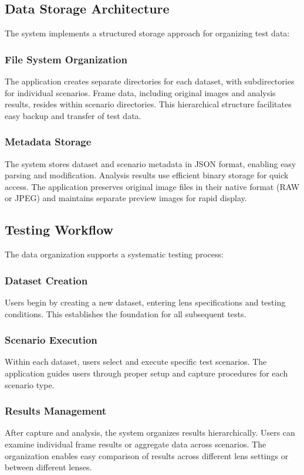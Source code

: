 \subsection{Data Storage Architecture}
The system implements a structured storage approach for organizing test data:

\subsubsection{File System Organization}
The application creates separate directories for each dataset, with subdirectories for individual scenarios. Frame data, including original images and analysis results, resides within scenario directories. This hierarchical structure facilitates easy backup and transfer of test data.

\subsubsection{Metadata Storage}
The system stores dataset and scenario metadata in JSON format, enabling easy parsing and modification. Analysis results use efficient binary storage for quick access. The application preserves original image files in their native format (RAW or JPEG) and maintains separate preview images for rapid display.

\subsection{Testing Workflow}
The data organization supports a systematic testing process:

\subsubsection{Dataset Creation}
Users begin by creating a new dataset, entering lens specifications and testing conditions. This establishes the foundation for all subsequent tests.

\subsubsection{Scenario Execution}
Within each dataset, users select and execute specific test scenarios. The application guides users through proper setup and capture procedures for each scenario type.

\subsubsection{Results Management}
After capture and analysis, the system organizes results hierarchically. Users can examine individual frame results or aggregate data across scenarios. The organization enables easy comparison of results across different lens settings or between different lenses.

